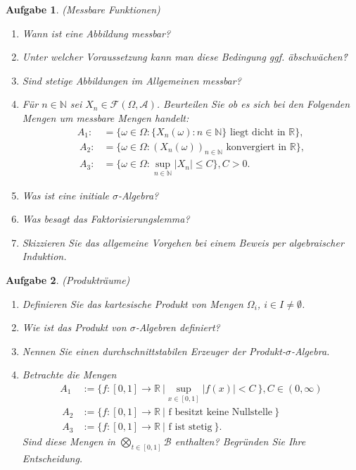 \documentclass[11pt, a4paper, ngerman]{article}
\newcommand{\N}{\mathbb{N}}
\newcommand{\R}{\mathbb{R}}
\newtheorem{aufgabe}{Aufgabe}
\begin{document}
\begin{aufgabe} (Messbare Funktionen)
    \begin{enumerate}
        \item
        Wann ist eine Abbildung messbar? 
        \item 
        Unter welcher Voraussetzung kann man diese Bedingung ggf. \"abschwächen\"? 
        \item 
        Sind stetige Abbildungen im Allgemeinen messbar? 
        \item 
        Für $n \in \N$ sei $X_n \in \mathcal{F}(\Omega, \mathcal{A})$. Beurteilen Sie ob es sich bei den Folgenden Mengen um messbare Mengen handelt: 
        \begin{align*}
            A_1 :&= \{\omega \in \Omega : \{X_n(\omega): n \in \N \} \text{ liegt dicht in } \R \}, \\\
            A_2 :&= \{\omega \in \Omega : (X_n(\omega))_{n \in \N} \text{ konvergiert in } \R \}, \\\
            A_3 :&= \{\omega \in \Omega : \sup_{n \in \N} \lvert X_n \rvert \leq C \}, C > 0. 
        \end{align*}
        \item
        Was ist eine initiale $\sigma$-Algebra?
        \item 
        Was besagt das Faktorisierungslemma? 
        \item 
        Skizzieren Sie das allgemeine Vorgehen bei einem Beweis per algebraischer Induktion. 
    \end{enumerate}
    
\end{aufgabe}

\begin{aufgabe} (Produkträume)
    \begin{enumerate}
        \item
        Definieren Sie das kartesische Produkt von Mengen $\Omega_i$, $i \in I \neq \emptyset$. 
        \item
        Wie ist das Produkt von $\sigma$-Algebren definiert?
        \item 
        Nennen Sie einen durchschnittstabilen Erzeuger der Produkt-$\sigma$-Algebra. 
        \item 
        Betrachte die Mengen 
        \begin{align*}
            A_1 &:= \{f:[0,1] \to \R \ \rvert \sup_{x \in [0,1]} \lvert f(x) \rvert < C \ \}, C \in (0,\infty) \\\
            A_2 &:= \{f:[0,1] \to \R \ \rvert \text{ f besitzt keine Nullstelle} \ \} \\\
            A_3 &:= \{f:[0,1] \to \R \ \rvert \text{ f ist stetig} \ \}. 
        \end{align*}
        Sind diese Mengen in $\bigotimes_{t \in [0,1]} \mathcal{B}$ enthalten? Begründen Sie Ihre Entscheidung. 

            

    \end{enumerate}
\end{aufgabe}
\end{document}
